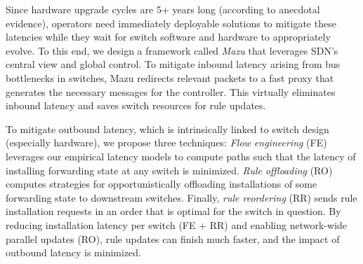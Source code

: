 


Since hardware upgrade cycles are 5+ years long (according to anecdotal
evidence), operators need immediately deployable solutions to 
mitigate these latencies while they wait for switch software and hardware to
appropriately evolve. To this end, we design a framework called {\em Mazu}
that leverages SDN's central view and global control.  To mitigate inbound
latency arising from bus bottlenecks in switches,
Mazu redirects relevant packets to a fast proxy that generates the 
necessary messages for the controller.
This virtually eliminates inbound latency and saves
switch resources for rule updates.

To mitigate outbound latency, which is intrinsically linked to switch
design (especially hardware),
we propose three techniques: {\em Flow
  engineering} (FE) leverages our empirical latency models to compute
paths such that the latency of installing forwarding state at any
switch is minimized. {\em Rule
  offloading} (RO) computes strategies for opportunistically
offloading installations of some forwarding state to downstream switches.
Finally, {\em rule reordering} (RR) sends rule installation
requests in an order that is optimal for the switch in question. By reducing
installation latency per switch (FE + RR) and enabling network-wide parallel updates (RO), 
rule updates can finish much faster, and the impact of
outbound latency is minimized.

